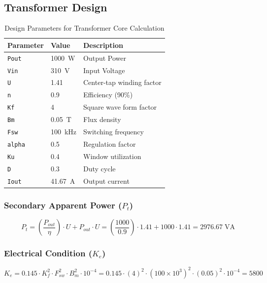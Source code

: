 \subsection{Transformer Design}
\begin{table}[h]
\centering
\caption{Design Parameters for Transformer Core Calculation}
\label{tab:parameters}
\begin{tabular}{lll}
\toprule
\textbf{Parameter} & \textbf{Value} & \textbf{Description} \\
\midrule
\texttt{Pout} & \SI{1000}{\watt} & Output Power \\
\texttt{Vin} & \SI{310}{\volt} & Input Voltage \\
\texttt{U} & 1.41 & Center-tap winding factor \\
\texttt{n} & 0.9 & Efficiency (90\%) \\
\texttt{Kf} & 4 & Square wave form factor \\
\texttt{Bm} & \SI{0.05}{\tesla} & Flux density \\
\texttt{Fsw} & \SI{100}{\kilo\hertz} & Switching frequency \\
\texttt{alpha} & 0.5 & Regulation factor \\
\texttt{Ku} & 0.4 & Window utilization \\
\texttt{D} & 0.3 & Duty cycle \\
\texttt{Iout} & \SI{41.67}{\ampere} & Output current \\
\bottomrule
\end{tabular}
\end{table}

\subsubsection*{Secondary Apparent Power (\(P_t\))}
\begin{equation}
P_t = \left(\frac{P_{out}}{\eta}\right) \cdot U + P_{out} \cdot U 
    = \left(\frac{1000}{0.9}\right) \cdot 1.41 + 1000 \cdot 1.41 
    = \boxed{2976.67\;\text{VA}}
\end{equation}


\subsubsection*{Electrical Condition (\(K_e\))}
\begin{equation}
K_e = 0.145 \cdot K_f^2 \cdot F_{sw}^2 \cdot B_m^2 \cdot 10^{-4} 
    = 0.145 \cdot (4)^2 \cdot (100 \times 10^3)^2 \cdot (0.05)^2 \cdot 10^{-4} 
    = \boxed{5800}
\end{equation}

